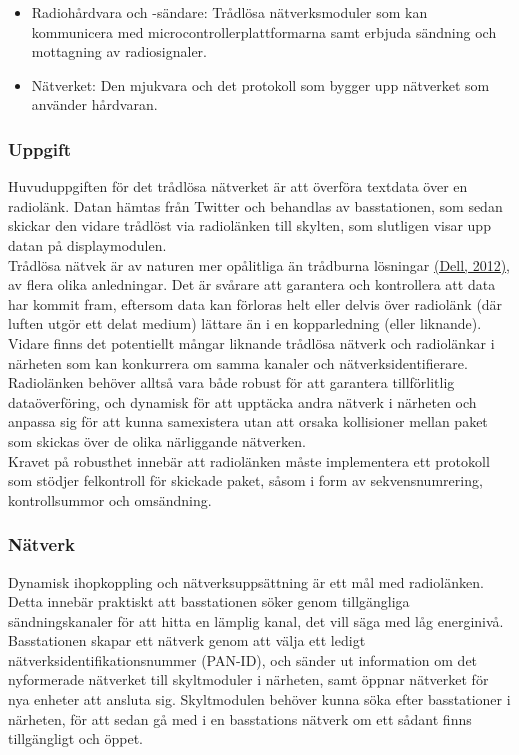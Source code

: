 \documentclass[a4paper,11pt]{article}
\begin{document}
	\begin{itemize}
	\item Radiohårdvara och -sändare: Trådlösa nätverksmoduler som kan kommunicera med microcontrollerplattformarna samt erbjuda sändning och mottagning av radiosignaler.
    	\item Nätverket: Den mjukvara och det protokoll som bygger upp nätverket som använder hårdvaran.
	\end{itemize}
	
\subsubsection{Uppgift}
Huvuduppgiften för det trådlösa nätverket är att överföra textdata över en radiolänk. Datan hämtas från Twitter och behandlas av basstationen, som sedan skickar den vidare trådlöst via radiolänken till skylten, som slutligen visar upp datan på displaymodulen. \\

Trådlösa nätvek är av naturen mer opålitliga än trådburna lösningar \hyperref[dell]{(Dell, 2012)}, av flera olika anledningar. Det är svårare att garantera och kontrollera att data har kommit fram, eftersom data kan förloras helt eller delvis över radiolänk (där luften utgör ett delat medium) lättare än i en kopparledning (eller liknande). Vidare finns det potentiellt mångar liknande trådlösa nätverk och radiolänkar i närheten som kan konkurrera om samma kanaler och nätverksidentifierare. Radiolänken behöver alltså vara både robust för att garantera tillförlitlig dataöverföring, och dynamisk för att upptäcka andra nätverk i närheten och anpassa sig för att kunna samexistera utan att orsaka kollisioner mellan paket som skickas över de olika närliggande nätverken. \\

Kravet på robusthet innebär att radiolänken måste implementera ett protokoll som stödjer felkontroll för skickade paket, såsom i form av sekvensnumrering, kontrollsummor och omsändning.

\subsubsection{Nätverk}
Dynamisk ihopkoppling och nätverksuppsättning är ett mål med radiolänken. Detta innebär praktiskt att basstationen söker genom tillgängliga sändningskanaler för att hitta en lämplig kanal, det vill säga med låg energinivå. Basstationen skapar ett nätverk genom att välja ett ledigt nätverksidentifikationsnummer (PAN-ID), och sänder ut information om det nyformerade nätverket till skyltmoduler i närheten, samt öppnar nätverket för nya enheter att ansluta sig. Skyltmodulen behöver kunna söka efter basstationer i närheten, för att sedan gå med i en basstations nätverk om ett sådant finns tillgängligt och öppet. \\
\end{document}
